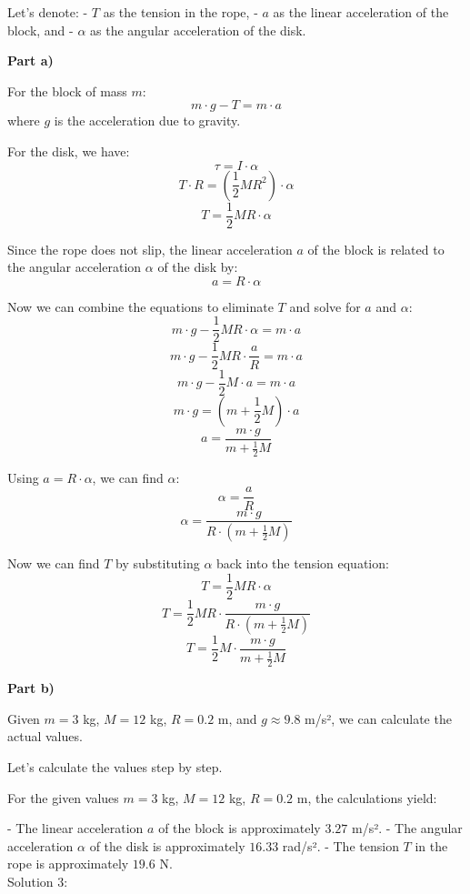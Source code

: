 \documentclass[a4paper,11pt]{article}
\begin{document}
Let's denote:
- \( T \) as the tension in the rope,
- \( a \) as the linear acceleration of the block, and
- \( \alpha \) as the angular acceleration of the disk.

\textbf{Part a)}

For the block of mass \( m \):
\[ m \cdot g - T = m \cdot a \]
where \( g \) is the acceleration due to gravity.

For the disk, we have:
\[ \tau = I \cdot \alpha \]
\[ T \cdot R = \left( \frac{1}{2} M R^2 \right) \cdot \alpha \]
\[ T = \frac{1}{2} M R \cdot \alpha \]

Since the rope does not slip, the linear acceleration \( a \) of the block is related to the angular acceleration \( \alpha \) of the disk by:
\[ a = R \cdot \alpha \]

Now we can combine the equations to eliminate \( T \) and solve for \( a \) and \( \alpha \):
\[ m \cdot g - \frac{1}{2} M R \cdot \alpha = m \cdot a \]
\[ m \cdot g - \frac{1}{2} M R \cdot \frac{a}{R} = m \cdot a \]
\[ m \cdot g - \frac{1}{2} M \cdot a = m \cdot a \]
\[ m \cdot g = \left( m + \frac{1}{2} M \right) \cdot a \]
\[ a = \frac{m \cdot g}{m + \frac{1}{2} M} \]

Using \( a = R \cdot \alpha \), we can find \( \alpha \):
\[ \alpha = \frac{a}{R} \]
\[ \alpha = \frac{m \cdot g}{R \cdot \left( m + \frac{1}{2} M \right)} \]

Now we can find \( T \) by substituting \( \alpha \) back into the tension equation:
\[ T = \frac{1}{2} M R \cdot \alpha \]
\[ T = \frac{1}{2} M R \cdot \frac{m \cdot g}{R \cdot \left( m + \frac{1}{2} M \right)} \]
\[ T = \frac{1}{2} M \cdot \frac{m \cdot g}{m + \frac{1}{2} M} \]

\textbf{Part b)}

Given \( m = 3 \) kg, \( M = 12 \) kg, \( R = 0.2 \) m, and \( g \approx 9.8 \) m/s², we can calculate the actual values.

Let's calculate the values step by step.

For the given values \( m = 3 \) kg, \( M = 12 \) kg, \( R = 0.2 \) m, the calculations yield:

- The linear acceleration \( a \) of the block is approximately \( 3.27 \) m/s².
- The angular acceleration \( \alpha \) of the disk is approximately \( 16.33 \) rad/s².
- The tension \( T \) in the rope is approximately \( 19.6 \) N. \\

\noindent Solution 3: \\ 
\end{document}
